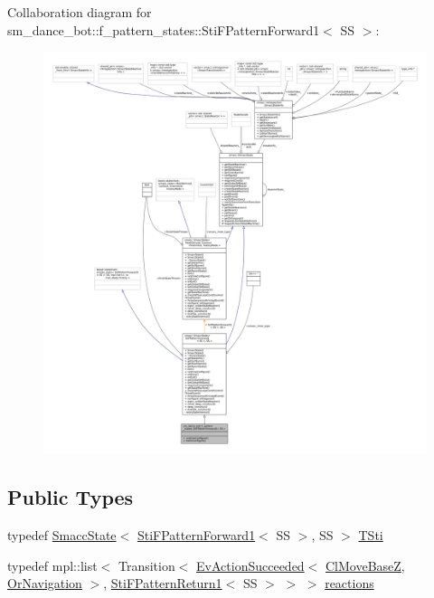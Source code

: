 Collaboration diagram for sm\+\_\+dance\+\_\+bot\+:\+:f\+\_\+pattern\+\_\+states\+:\+:Sti\+F\+Pattern\+Forward1$<$ SS $>$\+:
\nopagebreak
\begin{figure}[H]
\begin{center}
\leavevmode
\includegraphics[width=350pt]{structsm__dance__bot_1_1f__pattern__states_1_1StiFPatternForward1__coll__graph}
\end{center}
\end{figure}
\subsection*{Public Types}
\begin{DoxyCompactItemize}
\item 
typedef \hyperlink{classSmaccState}{Smacc\+State}$<$ \hyperlink{structsm__dance__bot_1_1f__pattern__states_1_1StiFPatternForward1}{Sti\+F\+Pattern\+Forward1}$<$ SS $>$, SS $>$ \hyperlink{structsm__dance__bot_1_1f__pattern__states_1_1StiFPatternForward1_a7dff4a86e12407b2daf0d34aba22d21b}{T\+Sti}
\item 
typedef mpl\+::list$<$ Transition$<$ \hyperlink{structsmacc_1_1default__events_1_1EvActionSucceeded}{Ev\+Action\+Succeeded}$<$ \hyperlink{classcl__move__base__z_1_1ClMoveBaseZ}{Cl\+Move\+BaseZ}, \hyperlink{classsm__dance__bot_1_1OrNavigation}{Or\+Navigation} $>$, \hyperlink{structsm__dance__bot_1_1f__pattern__states_1_1StiFPatternReturn1}{Sti\+F\+Pattern\+Return1}$<$ SS $>$ $>$ $>$ \hyperlink{structsm__dance__bot_1_1f__pattern__states_1_1StiFPatternForward1_a17e681abc29409eb4d79ac3d75e91ddf}{reactions}
\end{DoxyCompactItemize}
